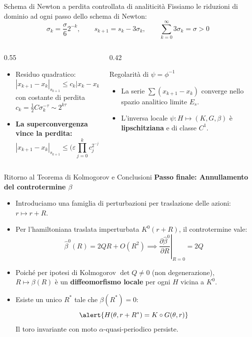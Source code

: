\documentclass[10pt,aspectratio=169]{beamer}
\newcommand{\eps}{\varepsilon}
\newcommand{\blu}[1]{\textcolor{UniBlue}{\textbf{#1}}}
\begin{document}
\begin{frame}{Schema di Newton a perdita controllata di analiticità}
  Fissiamo le riduzioni di dominio ad ogni passo dello schema di Newton:
  \[
    \sigma_k = \frac{\sigma}{6} 2^{-k}, \qquad s_{k+1} = s_k - 3\sigma_k, \qquad \sum_{k=0}^\infty 3\sigma_k = \sigma > 0
  \]
  \begin{columns}[c]
    \begin{column}{0.55\textwidth}
      \begin{itemize}
        \item Residuo quadratico:
        \[
          |x_{k+1} - x_k|_{s_{k+1}} \le c_k |x_k - x_{k-1}|_{s_k}^2
        \]
        con costante di perdita $c_k = \frac{1}{2} C \sigma_k^{-\tau} \sim 2^{k\tau}$
        \medskip
        \item \blu{La superconvergenza vince la perdita:}
        \[
          |x_{k+1} - x_k|_{s_{k+1}} \le \Big(\eps \prod_{j=0}^k c_j^{2^{-j}}\Big)^{2^k} \le \text{cost} \cdot \eps^{2^k}
        \]
      \end{itemize}
    \end{column}
    \begin{column}{0.42\textwidth}
      \begin{block}{Regolarità di $\psi = \phi^{-1}$}
        \begin{itemize}
          \item La serie $\sum (x_{k+1} - x_k)$ converge nello spazio analitico limite $E_s$.
          \item L'inversa locale $\psi : H \mapsto (K, G, \beta)$ è \textbf{lipschitziana} e di classe $C^1$.
        \end{itemize}
      \end{block}
    \end{column}
  \end{columns}
\end{frame}

\begin{frame}{Ritorno al Teorema di Kolmogorov e Conclusioni}
  \blu{Passo finale: Annullamento del controtermine $\beta$}
  \begin{itemize}
    \item Introduciamo una famiglia di perturbazioni per traslazione delle azioni: $r \mapsto r + R$.
    \item Per l'hamiltoniana traslata imperturbata $K^0(r+R)$, il controtermine vale:
    \[
      \widehat{\beta}^0(R) = 2QR + O(R^2) \implies \left.\frac{\partial \widehat{\beta}^0}{\partial R}\right|_{R=0} = 2Q
    \]
    \item Poiché per ipotesi di Kolmogorov $\det Q \neq 0$ (non degenerazione), $R \mapsto \beta(R)$ è un \textbf{diffeomorfismo locale} per ogni $H$ vicina a $K^0$.
    \item Esiste un unico $R^*$ tale che $\beta(R^*) = 0$:
    \[
      \alert{H(\theta, r+R^*) = K \circ G(\theta, r)}
    \]
    Il toro invariante con moto $\alpha$-quasi-periodico persiste.
  \end{itemize}
\end{frame}
\end{document}
